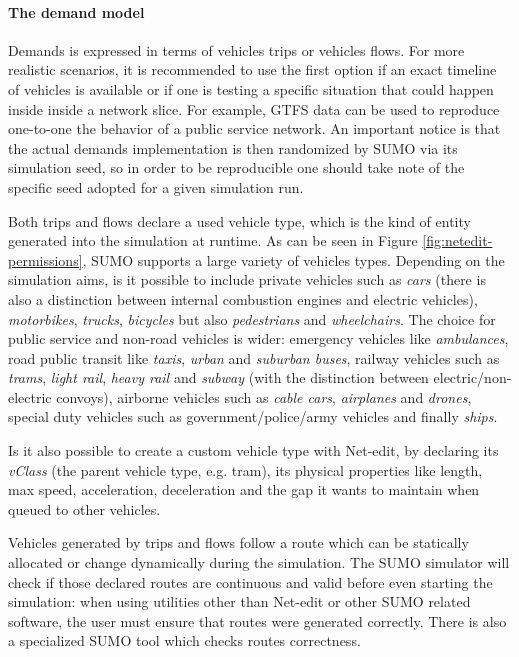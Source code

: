 \paragraph{The demand model}

Demands is expressed in terms of vehicles trips or vehicles flows. For more realistic scenarios, it is recommended to use the first option if an exact timeline of vehicles is available or if one is testing a specific situation that could happen inside inside a network slice. For example, GTFS data can be used to reproduce one-to-one the behavior of a public service network. An important notice is that the actual demands implementation is then randomized by SUMO via its simulation seed, so in order to be reproducible one should take note of the specific seed adopted for a given simulation run.

Both trips and flows declare a used vehicle type, which is the kind of entity generated into the simulation at runtime. As can be seen in Figure \ref{fig:netedit-permissions}, SUMO supports a large variety of vehicles types. Depending on the simulation aims, is it possible to include private vehicles such as \textit{cars} (there is also a distinction between internal combustion engines and electric vehicles), \textit{motorbikes}, \textit{trucks}, \textit{bicycles} but also \textit{pedestrians} and \textit{wheelchairs}. The choice for public service and non-road vehicles is wider: emergency vehicles like \textit{ambulances}, road public transit like \textit{taxis}, \textit{urban} and \textit{suburban buses}, railway vehicles such as \textit{trams}, \textit{light rail}, \textit{heavy rail} and \textit{subway} (with the distinction between electric/non-electric convoys), airborne vehicles such as \textit{cable cars}, \textit{airplanes} and \textit{drones}, special duty vehicles such as government/police/army vehicles and finally \textit{ships}.

Is it also possible to create a custom vehicle type with Net-edit, by declaring its \textit{vClass} (the parent vehicle type, e.g. tram), its physical properties like length, max speed, acceleration, deceleration and the gap it wants to maintain when queued to other vehicles.

Vehicles generated by trips and flows follow a route which can be statically allocated or change dynamically during the simulation. The SUMO simulator will check if those declared routes are continuous and valid before even starting the simulation: when using utilities other than Net-edit or other SUMO related software, the user must ensure that routes were generated correctly. There is also a specialized SUMO tool which checks routes correctness.

